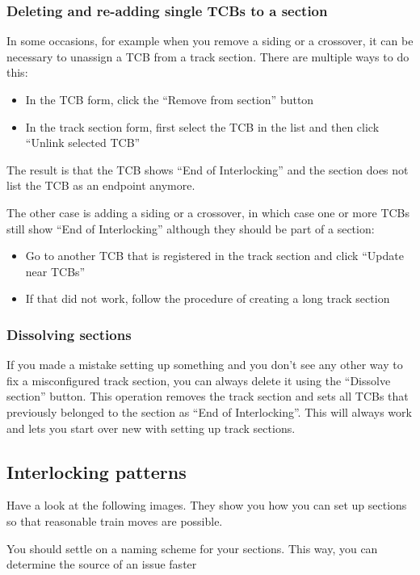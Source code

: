 \documentclass[english]{paper}
\begin{document}
\subsubsection{Deleting and re-adding single TCBs to a section}

In some occasions, for example when you remove a siding or a crossover,
it can be necessary to unassign a TCB from a track section. There
are multiple ways to do this:
\begin{itemize}
\item In the TCB form, click the ``Remove from section'' button
\item In the track section form, first select the TCB in the list and then
click ``Unlink selected TCB''
\end{itemize}
The result is that the TCB shows ``End of Interlocking'' and the
section does not list the TCB as an endpoint anymore.

The other case is adding a siding or a crossover, in which case one
or more TCBs still show ``End of Interlocking'' although they should
be part of a section:
\begin{itemize}
\item Go to another TCB that is registered in the track section and click
``Update near TCBs''
\item If that did not work, follow the procedure of creating a long track
section
\end{itemize}

\subsubsection{Dissolving sections}

If you made a mistake setting up something and you don't see any other
way to fix a misconfigured track section, you can always delete it
using the ``Dissolve section'' button. This operation removes the
track section and sets all TCBs that previously belonged to the section
as ``End of Interlocking''. This will always work and lets you start
over new with setting up track sections.

\subsection{Interlocking patterns}

Have a look at the following images. They show you how you can set
up sections so that reasonable train moves are possible.

You should settle on a naming scheme for your sections. This way,
you can determine the source of an issue faster
\end{document}
